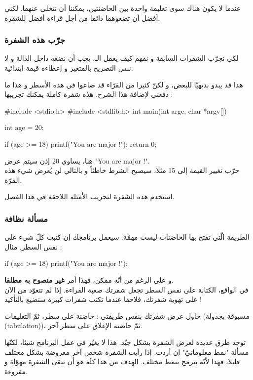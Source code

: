 \begin{information}
عندما لا يكون هناك سوى تعليمة واحدة بين الحاضنتين، يمكننا أن نتخلى عنهما. لكني أفضل أن تضعوهما دائما من أجل قراءة أفضل للشفرة.
\end{information}

\subsubsection{جرّب هذه الشفرة}
لكي نجرّب الشفرات السابقة و نفهم كيف يعمل الـ، يجب أن نضعه داخل الدالة
و لا ننس التصريح بالمتغير 
و إعطاءه قيمة ابتدائية.

هذا قد يبدو بديهيّا للبعض، و لكنّ كثيرا من القرّاء قد ضاعوا في هذه الأسطر و هذا ما دفعني لإضافة هذا الشرح. هذه شفرة كاملة يمكنك تجريبها :

\begin{Csource}
#include <stdio.h>
#include <stdlib.h>
int main(int argc, char *argv[])
{
	int age = 20;
	
	if (age >= 18)
	{
		printf("You are major !\n");
	}
	return 0;
}
\end{Csource}

هنا،
يساوي 20 إذن سيتم عرض
"\textenglish{You are major !}".\\
جرّب تغيير القيمة إلى 15 مثلا، سيصبح الشرط خاطئاً و بالتالي لن يُعرض شيء هذه المرّة.

استخدم هذه الشفرة لتجريب الأمثلة اللاحقة في هذا الفصل.

\subsubsection{مسألة نظافة}

الطريقة الّتي تفتح بها الحاضنات ليست مهمّة. سيعمل برنامجك إن كتبت كلّ شيء على نفس السطر. مثال :

\begin{Csource}
if (age >= 18) { printf("You are major !"); }
\end{Csource}

و على الرغم من أنّه ممكن، فهذا أمر
\textbf{غير منصوح به مطلقا}.\\
في الواقع، الكتابة على نفس السطر تجعل شفرتك صعبة القراءة. إذا لم تتعوّد من الآن على تهوية شفرتك، فلاحقا عندما تكتب شفرات كبيرة ستضيع بالتأكيد !

حاول عرض شفرتك بنفس طريقتي : حاضنة على سطر، ثمّ التعليمات (مسبوقة بجدولة 
(\textenglish{tabulation}))،
 ثمّ حاضنة الإغلاق على سطر آخر.

\begin{information}
توجد طرق عديدة لعرض الشفرة بشكل جيّد. هذا لا يغيّر في عمل البرنامج شيئا، لكنّها مسألة "نمط معلوماتيّ" إن أردت. إذا رأيت الشفرة شخص آخر معروضة بشكل مختلف قليلا، فهذا لأنّه يبرمج بنمط مختلف. الهدف من هذا كلّه هو أن تبقى الشفرة مهوّاة و مقروءة.
\end{information}

